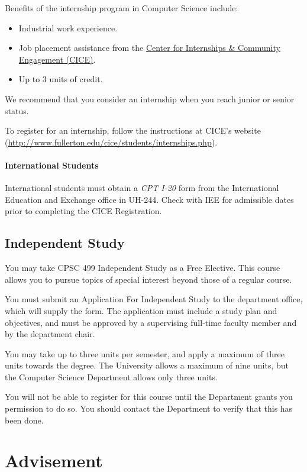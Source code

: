 \documentclass{book}
\begin{document}
Benefits of the internship program in Computer Science include:
\begin{itemize}
\item Industrial work experience.
\item Job placement assistance from the \href{http://www.fullerton.edu/cice/students/internships.php}{Center for Internships \& Community Engagement (CICE)}.
\item Up to 3 units of credit.
\end{itemize}

We recommend that you consider an internship when you reach junior or senior status.

To register for an internship, follow the instructions at CICE's website (\url{http://www.fullerton.edu/cice/students/internships.php}).

\subsubsection{International Students}

International students must obtain a \emph{CPT I-20} form from the International Education and Exchange office in UH-244. Check with IEE for admissible dates prior to completing the CICE Registration.

\section{Independent Study}

You may take CPSC 499 Independent Study as a Free Elective. This course allows you to pursue topics of special interest beyond those of a regular course.

You must submit an Application For Independent Study to the department office, which will supply the form. The application must include a study plan and objectives, and must be approved by a supervising full‑time faculty member and by the department chair.

You may take up to three units per semester, and apply a maximum of three units towards the degree. The University allows a maximum of nine units, but the Computer Science Department allows only three units.

You will not be able to register for this course until the Department grants you permission to do so. You should contact the Department to verify that this has been done.

\chapter{Advisement}
\end{document}
